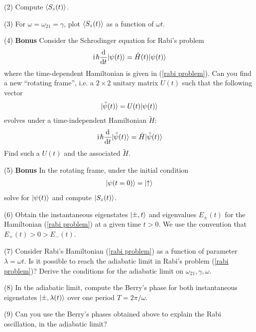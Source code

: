 (2) Compute $\langle{S_z(t)}\rangle$. 

(3) For $\omega=\omega_{21}=\gamma$, plot $\langle{S_z(t)}\rangle$ as a function of $\omega t$.  

(4) \textbf{Bonus} Consider the Schrodinger equation for Rabi's problem
\begin{align}
\hspace{1pt}\mathrm{i}\hspace{1pt}\hbar\frac{\text{d}}{\text{d}t}|{\psi(t)}\rangle=\hat H(t)|{\psi(t)}\rangle
\end{align}
where the time-dependent Hamiltonian is given in (\ref{rabi problem}). Can you find a new ``rotating frame'', i.e. a $2\times 2$ unitary matrix $U(t)$ such that the following vector
\begin{align}
|{\tilde\psi(t)}\rangle=U(t)|{\psi(t)}\rangle
\end{align}
evolves under a time-independent Hamiltonian $\tilde H$:
\begin{align}
\hspace{1pt}\mathrm{i}\hspace{1pt}\hbar\frac{\text{d}}{\text{d}t}|{\tilde\psi(t)}\rangle=\tilde H|{\tilde\psi(t)}\rangle
\end{align}
Find such a $U(t)$ and the associated $\tilde H$. 

(5) \textbf{Bonus} In the rotating frame, under the initial condition
\begin{align}
|{\psi(t=0)}\rangle=|{\uparrow}\rangle
\end{align}
solve for $|{\psi(t)}\rangle$ and compute $|{S_z(t)}\rangle$. 


(6) Obtain the instantaneous eigenstates $|{\pm,t}\rangle$ and eigenvalues $E_\pm(t)$ for the Hamiltonian (\ref{rabi problem}) at a given time $t>0$. We use the convention that $E_+(t)>0>E_-(t)$. 


(7) Consider Rabi's Hamiltonian (\ref{rabi problem}) as a function of parameter $\lambda=\omega t$. Is it possible to reach the adiabatic limit in Rabi's problem (\ref{rabi problem})? Derive the conditions for the adiabatic limit on $\omega_{21},\gamma,\omega$. 

(8) In the adiabatic limit, compute the Berry's phase for both instantaneous eigenstates $|{\pm,\lambda(t)}\rangle$ over one period $T=2\pi/\omega$. 

(9) Can you use the Berry's phases obtained above to explain the Rabi oscillation, in the adiabatic limit? 

